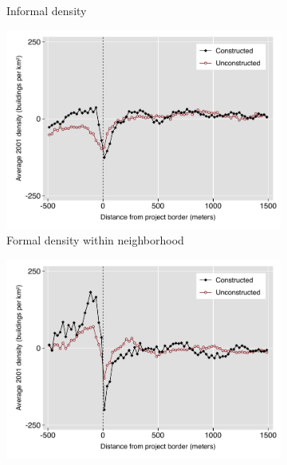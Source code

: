 \documentclass[12pt]{article}
\begin{document}
\begin{figure}[h!]
\begin{subfigure}[b]{0.495\textwidth}
            \caption[]%
            {{\small Informal density}}    
            \label{fig:preinf_raw}
        \end{subfigure}
        \begin{subfigure}[b]{0.495\textwidth}
            \centering
            \includegraphics[width=\textwidth,trim={0.3cm .3cm 0.1cm 0cm}, clip=true]{figures/bblu_for_fe_pre_means_4_spk.pdf}
            \caption[Network2]%
            {{\small Formal density within neighborhood}}    
            \label{fig:prefor_fe}
        \end{subfigure}
        \hfill
        \begin{subfigure}[b]{0.495\textwidth}  
            \centering 
            \includegraphics[width=\textwidth,trim={0.3cm .3cm 0.1cm 0cm}, clip=true]{figures/bblu_inf_fe_pre_means_4_spk.pdf}

\end{subfigure}
\end{figure}
\end{document}
